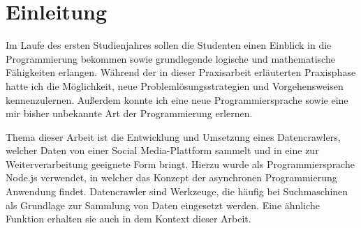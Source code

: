 
\chapter{Einleitung}
Im Laufe des ersten Studienjahres sollen die Studenten einen Einblick in die Programmierung bekommen sowie grundlegende logische und mathematische Fähigkeiten erlangen. Während der in dieser Praxisarbeit erläuterten Praxisphase hatte ich die Möglichkeit, neue Problemlösungsstrategien und Vorgehensweisen kennenzulernen. Außerdem konnte ich eine neue Programmiersprache sowie eine mir bisher unbekannte Art der Programmierung erlernen.

Thema dieser Arbeit ist die Entwicklung und Umsetzung eines Datencrawlers, welcher Daten von einer Social Media-Plattform sammelt und in eine zur Weiterverarbeitung geeignete Form bringt. Hierzu wurde als Programmiersprache Node.js verwendet, in welcher das Konzept der asynchronen Programmierung Anwendung findet. 
Datencrawler sind Werkzeuge, die häufig bei Suchmaschinen als Grundlage zur Sammlung von Daten eingesetzt werden. Eine ähnliche Funktion erhalten sie auch in dem Kontext dieser Arbeit.


